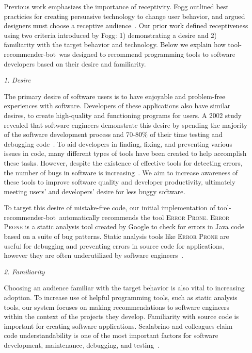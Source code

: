 \documentclass[conference]{IEEEtran}
\newcommand{\tool}{tool-recommender-bot}
\newcommand{\pseudosection}[1]{\vspace{2mm} \noindent {\bf #1}}
\newcommand{\pseudosubsection}[1]{\vspace{2mm} {\it #1}}
\begin{document}
\pseudosection{Receptiveness}

Previous work emphasizes the importance of receptivity. Fogg outlined best practicies for creating persuasive technology to change user behavior, and argued designers must choose a receptive audience~\cite{FoggPersuasive}. Our prior work defined receptiveness using two criteria introduced by Fogg: 1) demonstrating a desire and 2) familiarity with the target behavior and technology. Below we explain how \tool~was designed to recommend programming tools to software developers based on their desire and familiarity.

\pseudosubsection{1. Desire}

The primary desire of software users is to have enjoyable and problem-free experiences with software. Developers of these applications also have similar desires, to create high-quality and functioning programs for users. A 2002 study revealed that software engineers demonstrate this desire by spending the majority of the software development process and 70-80\% of their time testing and debugging code~\cite{NIST}. To aid developers in finding, fixing, and preventing various issues in code, many different types of tools have been created to help accomplish these tasks. However, despite the existence of effective tools for detecting errors, the number of bugs in software is increasing~\cite{HaveThingsChanged}. We aim to increase awareness of these tools to improve software quality and developer productivity, ultimately meeting users' and developers' desire for less buggy software.

To target this desire of mistake-free code, our initial implementation of \tool~automatically recommends the tool \textsc{Error Prone}. \textsc{Error Prone} is a static analysis tool created by Google to check for errors in Java code based on a suite of bug patterns. Static analysis tools like \textsc{Error Prone} are useful for debugging and preventing errors in source code for applications, however they are often underutilized by software engineers~\cite{Johnson2013Why}. 

\pseudosubsection{2. Familiarity}

Choosing an audience familiar with the target behavior is also vital to increasing adoption. To increase use of helpful programming tools, such as static analysis tools, our system focuses on making recommendations to software engineers within the context of the projects they develop. Familiarity with source code is important for creating software applications. Scalabrino and colleagues claim code understandability is one of the most important factors for software development, maintenance, debugging, and testing~\cite{Scalabrino2017Understandability}.
\end{document}
